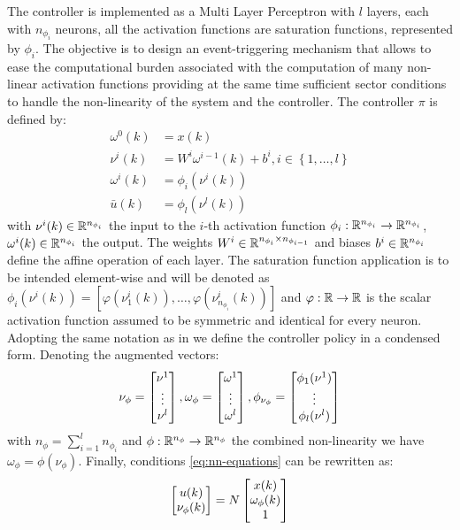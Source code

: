 \documentclass{article}
\begin{document}
The controller is implemented as a Multi Layer Perceptron with $l$ layers, each with $n_{\phi_i}$ neurons, all the activation functions are saturation functions, represented by $\phi_i$. The objective is to design an event-triggering mechanism that allows to ease the computational burden associated with the computation of many non-linear activation functions providing at the same time sufficient sector conditions to handle the non-linearity of the system and the controller. The controller $\pi$ is defined by:
\begin{equation}\label{eq:nn-equations}
  \begin{aligned}
  \omega^{0}(k) &= x(k) \\
  \nu^{i}(k) &= W^{i} \omega^{i - 1}(k) + b^{i}, i \in \left\{ 1, \dots, l \right\}\\
  \omega^{i}(k) &= \phi_i(\nu^i(k))\\
  \bar{u}(k) &= \phi_l(\nu^l(k))
  \end{aligned} 
\end{equation}
with $\nu^i(k) \in {\mathbb{R}}^{n_{\phi_i}}$ the input to the $i$-th activation function $\phi_i: {\mathbb{R}}^{n_{\phi_i}} \to {\mathbb{R}}^{n_{\phi_i}}$, $\omega^i(k) \in {\mathbb{R}}^{n_{\phi_i}}$ the output. The weights $W^i \in {\mathbb{R}}^{n_{\phi_i} \times n_{\phi_{i-1}}}$ and biases $b^i \in {\mathbb{R}}^{n_{\phi_i}}$ define the affine operation of each layer. The saturation function application is to be intended element-wise and will be denoted as $\phi_i(\nu^i(k)) = \left[ \varphi(\nu^i_1(k)), \dots, \varphi(\nu^i_{n_{\phi_i}}(k)) \right]$ and $\varphi: {\mathbb{R}} \to {\mathbb{R}}$ is the scalar activation function assumed to be symmetric and identical for every neuron. Adopting the same notation as in \cite{css-paper} we define the controller policy in a condensed form. Denoting the augmented vectors:
\begin{equation*}
  \nu_{\phi} = \left[\begin{matrix}\nu^1 \\ \vdots \\ \nu^l\end{matrix}\right], \omega_{\phi} = \left[\begin{matrix}\omega^1 \\ \vdots \\ \omega^l\end{matrix}\right], \phi_{\nu_{\phi}} = \left[\begin{matrix}\phi_1(\nu^1) \\ \vdots \\ \phi_l(\nu^l)\end{matrix}\right] 
\end{equation*}
with $n_{\phi} = \sum_{i=1}^{l} n_{\phi_i}$ and $\phi: {\mathbb{R}}^{n_{\phi}} \to {\mathbb{R}}^{n_{\phi}}$ the combined non-linearity we have $\omega_\phi = \phi(\nu_\phi)$. Finally, conditions \ref{eq:nn-equations} can be rewritten as:
\begin{equation*}
  \left[\begin{matrix}u(k)\\ \nu_\phi(k)\end{matrix}\right] = N \left[\begin{matrix}x(k) \\ \omega_\phi(k) \\ 1\end{matrix}\right] 
\end{equation*}
\end{document}
